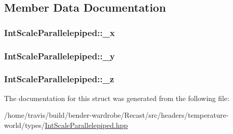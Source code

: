 \subsection{Member Data Documentation}
\hypertarget{struct_int_scale_parallelepiped_a81ba3ef17d50475ba400ecae4f45a528}{
\subsubsection[{\-\_\-x}]{ Int\-Scale\-Parallelepiped\-::\-\_\-x\hspace{0.3cm}{\ttfamily [protected]}}}\label{struct_int_scale_parallelepiped_a81ba3ef17d50475ba400ecae4f45a528}
\hypertarget{struct_int_scale_parallelepiped_a42cea4ad40c67c30fc3647b4260c8a44}{
\subsubsection[{\-\_\-y}]{ Int\-Scale\-Parallelepiped\-::\-\_\-y\hspace{0.3cm}{\ttfamily [protected]}}}\label{struct_int_scale_parallelepiped_a42cea4ad40c67c30fc3647b4260c8a44}
\hypertarget{struct_int_scale_parallelepiped_a613558e63f3ecc557cc086d8ddb17d30}{
\subsubsection[{\-\_\-z}]{ Int\-Scale\-Parallelepiped\-::\-\_\-z\hspace{0.3cm}{\ttfamily [protected]}}}\label{struct_int_scale_parallelepiped_a613558e63f3ecc557cc086d8ddb17d30}


The documentation for this struct was generated from the following file\-:\begin{DoxyCompactItemize}
\item 
/home/travis/build/bender-\/wardrobe/\-Recast/src/headers/temperature-\/world/types/\hyperlink{_int_scale_parallelepiped_8hpp}{Int\-Scale\-Parallelepiped.\-hpp}\end{DoxyCompactItemize}
